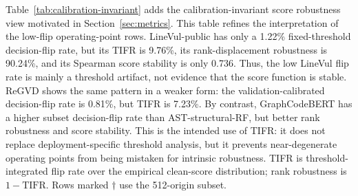 \documentclass[a4paper,fleqn]{cas-dc}
\begin{document}
\begin{table}[t]
  \centering
  \caption{Public detector results on CodeXGLUE.}
  \label{tab:public-exact-slice}
\end{table}

Table~\ref{tab:calibration-invariant} adds the calibration-invariant score
robustness view motivated in Section~\ref{sec:metrics}. This table refines the
interpretation of the low-flip operating-point rows. LineVul-public has only a
1.22\% fixed-threshold decision-flip rate, but its TIFR is 9.76\%, its
rank-displacement robustness is 90.24\%, and its Spearman score stability is
only 0.736. Thus, the low LineVul flip rate is mainly a threshold artifact, not
evidence that the score function is stable. ReGVD shows the same pattern in a
weaker form: the validation-calibrated decision-flip rate is 0.81\%, but TIFR
is 7.23\%. By contrast, GraphCodeBERT has a higher subset decision-flip rate
than AST-structural-RF, but better rank robustness and score stability. This
is the intended use of TIFR: it does not replace deployment-specific threshold
analysis, but it prevents near-degenerate operating points from being mistaken
for intrinsic robustness.
TIFR is threshold-integrated flip rate over the empirical clean-score
distribution; rank robustness is $1-\text{TIFR}$. Rows marked $\dagger$ use the
512-origin subset.
\end{document}
